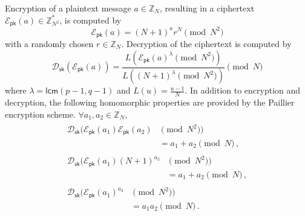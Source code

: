 \documentclass[letterpaper, 10 pt, conference]{ieeeconf}
\begin{document}
Encryption of a plaintext message $a \in \mathbb{Z}_N$, resulting in a ciphertext $\mathcal{E}_\mathsf{pk}(a) \in \mathbb{Z}^*_{N^2}$, is computed by
\begin{equation}
    \mathcal{E}_\mathsf{pk}(a) = (N+1)^a r^N \pmod{N^2}
\end{equation}
with a randomly chosen $r \in \mathbb{Z}_N$. Decryption of the ciphertext is computed by
\begin{equation}
    \mathcal{D}_\mathsf{sk}(\mathcal{E}_\mathsf{pk}(a)) = \frac{L\left(\mathcal{E}_\mathsf{pk}(a)^\lambda \pmod{N^2}\right)}{L\left((N+1)^\lambda \pmod{N^2}\right)}\pmod{N}
\end{equation}
where $\lambda = \mathsf{lcm}(p-1,q-1)$ and $L(u)=\frac{u-1}{N}$. In addition to encryption and decryption, the following homomorphic properties are provided by the Paillier encryption scheme. $\forall a_1,a_2 \in \mathbb{Z}_N$,
\begin{align}
    \begin{split}\label{eqn:paillier_add}
        \mathcal{D}_\mathsf{sk}(\mathcal{E}_\mathsf{pk}(a_1)\mathcal{E}_\mathsf{pk}(a_2) & \pmod{N^2})\\
        &= a_1+a_2 \pmod{N}\,,
    \end{split}\\
    \begin{split}\label{eqn:paillier_add_known}
        \mathcal{D}_\mathsf{sk}(\mathcal{E}_\mathsf{pk}(a_1)(N+1)^{a_2} & \pmod{N^2})\\
        &= a_1+a_2\pmod{N}\,,
    \end{split}\\
    \begin{split}
        \mathcal{D}_\mathsf{sk}(\mathcal{E}_\mathsf{pk}(a_1)^{a_2} & \pmod{N^2})\\
        &= a_1a_2 \pmod{N}\,.
    \end{split}
\end{align}
\end{document}

